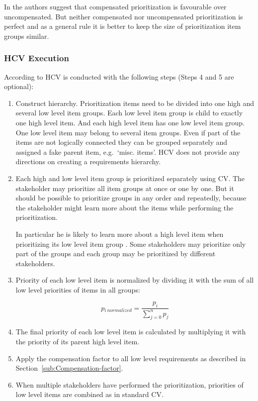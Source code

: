 In \citep{Berander2009a} the authors suggest that compensated prioritization is favourable
over uncompensated. But neither compensated nor uncompensated prioritization
is perfect and as a general rule it is better to keep the size of
prioritization item groups similar.


\subsubsection{HCV Execution}

According to \citep{Berander2006a} HCV is conducted with the following
steps (Steps 4 and 5 are optional):

\begin{enumerate}
\item Construct hierarchy. Prioritization items need to be divided into
one high and several low level item groups. Each low level item group
is child to exactly one high level item. And each high level item
has one low level item group. One low level item may belong to several
item groups. Even if part of the items are not logically connected they
can be grouped separately and assigned a fake parent item, e.g.\ `misc.
items'. HCV does not provide any directions on creating a requirements
hierarchy.

\item Each high and low level item group is prioritized separately using
CV. The stakeholder may prioritize all item groups at once or one by one.
But it should be possible to prioritize groups in any order and repeatedly,
because the stakeholder might learn more about the items while performing the prioritization.

In particular he is likely to learn more about a high level item when
prioritizing its low level item group \citep{Brenner2009}. Some stakeholders
may prioritize only part of the groups and each group may be prioritized
by different stakeholders.

\item Priority of each low level item is normalized by dividing it with
the sum of all low level priorities of items in all groups:

\begin{equation}
p{}_{i\, normalized}=\frac{p_{i}}{\sum_{j=0}^{n}p_{j}}\label{eq:norm}
\end{equation}

\item The final priority of each low level item is calculated by multiplying
it with the priority of its parent high level item.

\item Apply the compensation factor to all low level requirements as described
in Section~\ref{sub:Compensation-factor}.

\item When multiple stakeholders have performed the prioritization, priorities
of low level items are combined as in standard CV.
\end{enumerate}

